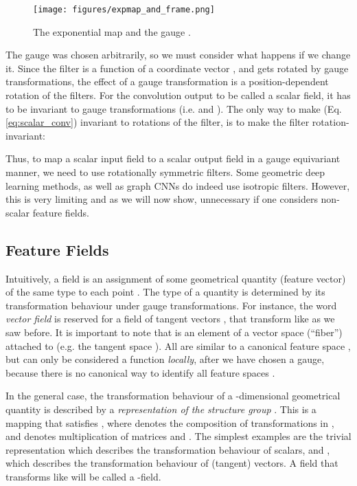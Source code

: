 \documentclass{article}
\begin{document}
\begin{figure}
    \centering
    \texttt{[image: figures/expmap\_and\_frame.png]}
    \caption{The exponential map and the gauge .}
    \label{fig:exponential_map}
\end{figure}

The gauge was chosen arbitrarily, so we must consider what happens if we change it.
Since the filter  is a function of a coordinate vector , and  gets rotated by gauge transformations, the effect of a gauge transformation is a position-dependent rotation of the filters.
For the convolution output to be called a scalar field, it has to be invariant to gauge transformations (i.e.  and ).
The only way to make  (Eq. \ref{eq:scalar_conv}) invariant to rotations of the filter, is to make the filter rotation-invariant:


Thus, to map a scalar input field to a scalar output field in a gauge equivariant manner, we need to use rotationally symmetric filters.
Some geometric deep learning methods, as well as graph CNNs do indeed use isotropic filters.
However, this is very limiting and as we will now show, unnecessary if one considers non-scalar feature fields.


\subsection{Feature Fields}
\label{sec:feature_fields}

Intuitively, a field is an assignment of some geometrical quantity (feature vector)  of the same type to each point .
The type of a quantity is determined by its transformation behaviour under gauge transformations.
For instance, the word \emph{vector field} is reserved for a field of tangent vectors , that transform like  as we saw before.
It is important to note that  is an element of a vector space (``fiber'')  attached to  (e.g. the tangent space ).
All  are similar to a canonical feature space , but  can only be considered a function  \emph{locally}, after we have chosen a gauge, because there is no canonical way to identify all feature spaces .

In the general case, the transformation behaviour of a -dimensional geometrical quantity is described by a \emph{representation of the structure group} .
This is a mapping  that satisfies , where  denotes the composition of transformations in , and  denotes multiplication of  matrices  and .
The simplest examples are the trivial representation  which describes the transformation behaviour of scalars, and , which describes the transformation behaviour of (tangent) vectors.
A field  that transforms like  will be called a -field.
\end{document}
